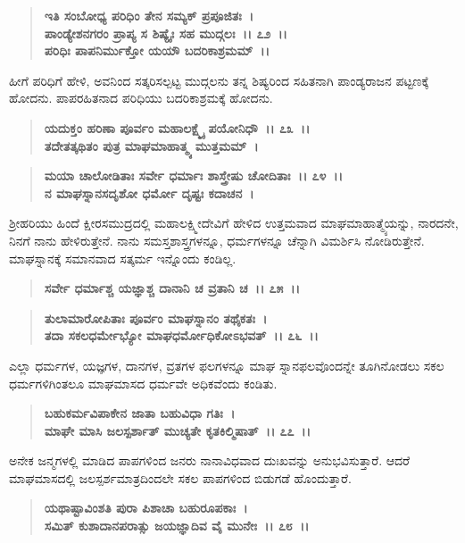 \begin{verse}
\textbf{ಇತಿ ಸಂಬೋಧ್ಯ ಪರಿಧಿಂ ತೇನ ಸಮ್ಯಕ್ ಪ್ರಪೂಜಿತಃ~।}\\\textbf{ಪಾಂಡ್ಯೇಶನಗರಂ ಪ್ರಾಪ್ಯ ಸ ಶಿಷ್ಯೈಃ ಸಹ ಮುದ್ಗಲಃ~।। ೭೨~।।}\\\textbf{ಪರಿಧಿಃ ಪಾಪನಿರ್ಮುಕ್ತೋ ಯಯೌ ಬದರಿಕಾಶ್ರಮಮ್~।।}
\end{verse}

ಹೀಗೆ ಪರಿಧಿಗೆ ಹೇಳಿ, ಅವನಿಂದ ಸತ್ಕರಿಸಲ್ಪಟ್ಟ ಮುದ್ಗಲನು ತನ್ನ ಶಿಷ್ಯರಿಂದ ಸಹಿತನಾಗಿ ಪಾಂಡ್ಯರಾಜನ ಪಟ್ಟಣಕ್ಕೆ ಹೋದನು. ಪಾಪರಹಿತನಾದ ಪರಿಧಿಯು ಬದರಿಕಾಶ್ರಮಕ್ಕೆ ಹೋದನು.

\begin{verse}
\textbf{ಯದುಕ್ತಂ ಹರಿಣಾ ಪೂರ್ವಂ ಮಹಾಲಕ್ಷ್ಮೈ ಪಯೋನಿಧೌ~।। ೭೩~।।}\\\textbf{ತದೇತತ್ಕಥಿತಂ ಪುತ್ರ ಮಾಘಮಾಹಾತ್ಮ್ಯ ಮುತ್ತಮಮ್~। }
\end{verse}

\begin{verse}
\textbf{ಮಯಾ ಚಾಲೋಡಿತಾಃ ಸರ್ವೇ ಧರ್ಮಾಃ ಶಾಸ್ತ್ರೇಷು ಚೋದಿತಾಃ~।। ೭೪~।।}\\\textbf{ನ ಮಾಘಸ್ನಾನಸದೃಶೋ ಧರ್ಮೋ ದೃಷ್ಟಃ ಕದಾಚನ~।}
\end{verse}

ಶ‍್ರೀಹರಿಯು ಹಿಂದೆ ಕ್ಷೀರಸಮುದ್ರದಲ್ಲಿ ಮಹಾಲಕ್ಷ್ಮೀದೇವಿಗೆ ಹೇಳಿದ ಉತ್ತಮವಾದ ಮಾಘಮಾಹಾತ್ಮ್ಯೆಯನ್ನು, ನಾರದನೇ, ನಿನಗೆ ನಾನು ಹೇಳಿರುತ್ತೇನೆ. ನಾನು ಸಮಸ್ತಶಾಸ್ತ್ರ\break ಗಳನ್ನೂ, ಧರ್ಮಗಳನ್ನೂ ಚೆನ್ನಾಗಿ ವಿಮರ್ಶಿಸಿ ನೋಡಿರುತ್ತೇನೆ. ಮಾಘಸ್ನಾನಕ್ಕೆ ಸಮಾನವಾದ ಸತ್ಕರ್ಮ ಇನ್ನೊಂದು ಕಂಡಿಲ್ಲ.

\begin{verse}
\textbf{ಸರ್ವೇ ಧರ್ಮಾಶ್ಚ ಯಜ್ಞಾಶ್ಚ ದಾನಾನಿ ಚ ವ್ರತಾನಿ ಚ~।। ೭೫~।।} 
\end{verse}

\begin{verse}
\textbf{ತುಲಾಮಾರೋಪಿತಾಃ ಪೂರ್ವಂ ಮಾಘಸ್ನಾನಂ ತಥೈಕತಃ~।}\\\textbf{ತದಾ ಸಕಲಧರ್ಮೇಭ್ಯೋ ಮಾಘಧರ್ಮೋಧಿಕೋಽಭವತ್~।। ೭೬~।।}
\end{verse}

ಎಲ್ಲಾ ಧರ್ಮಗಳ, ಯಜ್ಞಗಳ, ದಾನಗಳ, ವ್ರತಗಳ ಫಲಗಳನ್ನೂ ಮಾಘ ಸ್ನಾನಫಲವೊಂದನ್ನೇ ತೂಗಿನೋಡಲು ಸಕಲ ಧರ್ಮಗಳಿಗಿಂತಲೂ ಮಾಘಮಾಸದ ಧರ್ಮವೇ ಅಧಿಕವೆಂದು ಕಂಡಿತು.

\begin{verse}
\textbf{ಬಹುಕರ್ಮವಿಪಾಕೇನ ಜಾತಾ ಬಹುವಿಧಾ ಗತಿಃ~।}\\\textbf{ಮಾಘೇ ಮಾಸಿ ಜಲಸ್ಪರ್ಶಾತ್ ಮುಚ್ಯತೇ ಕೃತಕಿಲ್ಮಿಷಾತ್~।। ೭೭~।।}
\end{verse}

ಅನೇಕ ಜನ್ಮಗಳಲ್ಲಿ ಮಾಡಿದ ಪಾಪಗಳಿಂದ ಜನರು ನಾನಾವಿಧವಾದ ದುಃಖವನ್ನು ಅನುಭವಿಸುತ್ತಾರೆ. ಆದರೆ ಮಾಘಮಾಸದಲ್ಲಿ ಜಲಸ್ಪರ್ಶಮಾತ್ರದಿಂದಲೇ ಸಕಲ ಪಾಪಗಳಿಂದ ಬಿಡುಗಡೆ ಹೊಂದುತ್ತಾರೆ.

\begin{verse}
\textbf{ಯಥಾಷ್ಟಾವಿಂಶತಿ ಪುರಾ ಪಿಶಾಚಾ ಬಹುರೂಪಕಾಃ~।}\\\textbf{ಸಮಿತ್ ಕುಶಾದಾನಪರಾತ್ಸು ಜಯಜ್ಞಾದಿವ ವೈ ಮುನೇಃ~।। ೭೮~।।}
\end{verse}

